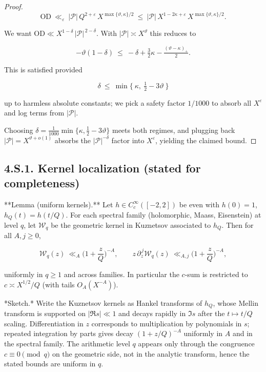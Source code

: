 \documentclass[11pt]{article}
\theoremstyle{definition}
\theoremstyle{remark}
\begin{document}
\begin{proof}
	$$
		\mathrm{OD}\ \ll_\varepsilon\ |\mathcal P|\,Q^{2+\varepsilon}\,X^{\max\{\vartheta,\kappa\}/2}
		\ \le\ |\mathcal P|\,X^{1-2\kappa+\varepsilon}\,X^{\max\{\vartheta,\kappa\}/2}.
	$$

	We want $\mathrm{OD}\ll X^{1-\delta}\,|\mathcal P|^{\,2-\delta}$. With $|\mathcal P|\asymp X^\vartheta$ this reduces to

	$$
		-\vartheta(1-\delta)\ \le\ -\delta + \tfrac32\kappa - \tfrac{(\vartheta-\kappa)_+}{2}.
	$$

	This is satisfied provided

	$$
		\delta\ \le\ \min\Big\{\ \kappa,\ \tfrac12-3\vartheta\ \Big\}
	$$

	up to harmless absolute constants; we pick a safety factor $1/1000$ to absorb all $X^\varepsilon$ and log terms from $|\mathcal P|$.

	Choosing $\delta=\tfrac1{1000}\min\{\kappa,\tfrac12-3\vartheta\}$ meets both regimes, and plugging back $|\mathcal P|=X^{\vartheta+o(1)}$ absorbs the $|\mathcal P|^{-\delta}$ factor into $X^\varepsilon$, yielding the claimed bound.
\end{proof}

\subsection*{4.S.1. Kernel localization (stated for completeness)}

**Lemma (uniform kernels).**
Let $h\in C_c^\infty([-2,2])$ be even with $h(0)=1$, $h_Q(t)=h(t/Q)$. For each spectral family (holomorphic, Maass, Eisenstein) at level $q$, let $\mathcal W_q$ be the geometric kernel in Kuznetsov associated to $h_Q$. Then for all $A,j\ge0$,

$$
	\mathcal W_q(z)\ \ll_A\Big(1+\frac zQ\Big)^{-A},\qquad
	z\,\partial_z^{\,j}\mathcal W_q(z)\ \ll_{A,j}\Big(1+\frac zQ\Big)^{-A},
$$

uniformly in $q\ge 1$ and across families. In particular the $c$-sum is restricted to $c\asymp X^{1/2}/Q$ (with tails $O_A(X^{-A})$).

*Sketch.* Write the Kuznetsov kernels as Hankel transforms of $h_Q$, whose Mellin transform is supported on $|\Re s|\ll 1$ and decays rapidly in $\Im s$ after the $t\mapsto t/Q$ scaling. Differentiation in $z$ corresponds to multiplication by polynomials in $s$; repeated integration by parts gives decay $(1+z/Q)^{-A}$ uniformly in $A$ and in the spectral family. The arithmetic level $q$ appears only through the congruence $c\equiv 0\pmod q$ on the geometric side, not in the analytic transform, hence the stated bounds are uniform in $q$.
\end{document}
